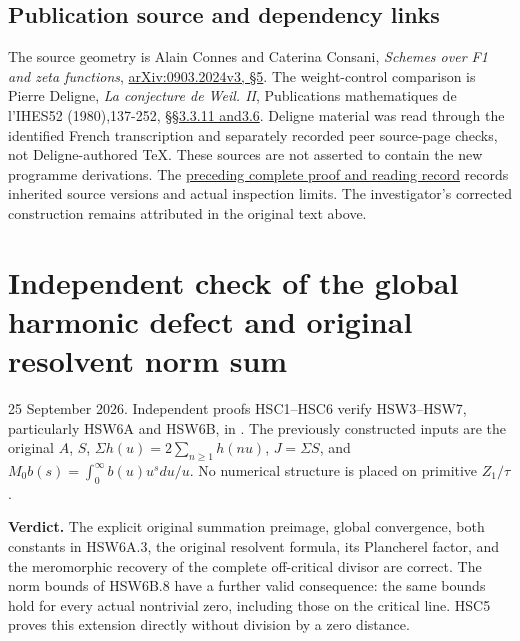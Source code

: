 \section{Publication source and dependency
links}\label{publication-source-and-dependency-links-15}

The source geometry is Alain Connes and Caterina Consani, \emph{Schemes
over F1 and zeta functions},
\href{https://arxiv.org/abs/0903.2024v3}{arXiv:0903.2024v3, §5}. The
weight-control comparison is Pierre Deligne, \emph{La conjecture de
Weil. II}, Publications mathematiques de l'IHES52 (1980),137-252,
\href{https://www.numdam.org/item/PMIHES_1980__52__137_0/}{§§3.3.11
and3.6}. Deligne material was read through the identified French
transcription and separately recorded peer source-page checks, not
Deligne-authored TeX. These sources are not asserted to contain the new
programme derivations. The
\href{https://github.com/KokunoYumeto/zeta-function-research-reader/blob/36a82ecca98addb8a98b48204e349737856c7223/workbenches/splitzero-tandem/continuations/20260924-cohomology-weight-and-character-lifts/BUILD_AND_REVIEW.md}{preceding
complete proof and reading record} records inherited source versions and
actual inspection limits. The investigator's corrected construction
remains attributed in the original text above.

\chapter{Independent check of the global harmonic defect and original
resolvent norm
sum}\label{independent-check-of-the-global-harmonic-defect-and-original-resolvent-norm-sum}

25 September 2026. Independent proofs HSC1--HSC6 verify HSW3--HSW7,
particularly HSW6A and HSW6B, in
\href{https://github.com/KokunoYumeto/zeta-function-research-reader/blob/main/workbenches/splitzero-tandem/continuations/20260925-full-source-tensor-and-original-divisor/counterfactual/ORIGINAL_ZETA_HARMONIC_SWEEP_AND_OFFCRITICAL_DEFECT.md}{}.
The previously constructed inputs are the original \(A\), \(S\),
\(\Sigma h(u)=2\sum_{n\ge1}h(nu)\), \(J=\Sigma S\), and
\(M_0b(s)=\int_0^\infty b(u)u^sdu/u\). No numerical structure is placed
on primitive \(Z_1/\tau\).

\textbf{Verdict.} The explicit original summation preimage, global
convergence, both constants in HSW6A.3, the original resolvent formula,
its Plancherel factor, and the meromorphic recovery of the complete
off-critical divisor are correct. The norm bounds of HSW6B.8 have a
further valid consequence: the same bounds hold for every actual
nontrivial zero, including those on the critical line. HSC5 proves this
extension directly without division by a zero distance.

